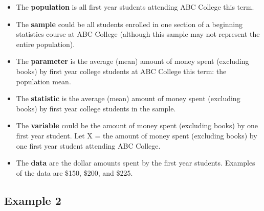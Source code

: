 \documentclass[
  letterpaper,
  DIV=11,
  numbers=noendperiod]{scrreprt}
\providecommand{\tightlist}{%
  \setlength{\itemsep}{0pt}\setlength{\parskip}{0pt}}\usepackage{longtable,booktabs,array}
\begin{document}
\begin{tcolorbox}[enhanced jigsaw, colframe=quarto-callout-tip-color-frame, bottomtitle=1mm, colbacktitle=quarto-callout-tip-color!10!white, bottomrule=.15mm, toprule=.15mm, breakable, leftrule=.75mm, left=2mm, rightrule=.15mm, colback=white, opacityback=0, opacitybacktitle=0.6, toptitle=1mm, titlerule=0mm, title=\textcolor{quarto-callout-tip-color}{\faLightbulb}\hspace{0.5em}{Solution}, arc=.35mm, coltitle=black]

\begin{itemize}
\tightlist
\item
  The \textbf{population} is all first year students attending ABC
  College this term.
\item
  The \textbf{sample} could be all students enrolled in one section of a
  beginning statistics course at ABC College (although this sample may
  not represent the entire population).
\item
  The \textbf{parameter} is the average (mean) amount of money spent
  (excluding books) by first year college students at ABC College this
  term: the population mean.
\item
  The \textbf{statistic} is the average (mean) amount of money spent
  (excluding books) by first year college students in the sample.
\item
  The \textbf{variable} could be the amount of money spent (excluding
  books) by one first year student. Let X = the amount of money spent
  (excluding books) by one first year student attending ABC College.
\item
  The \textbf{data} are the dollar amounts spent by the first year
  students. Examples of the data are \$150, \$200, and \$225.
\end{itemize}

\end{tcolorbox}

\subsection{Example 2}\label{example-2}
\end{document}
